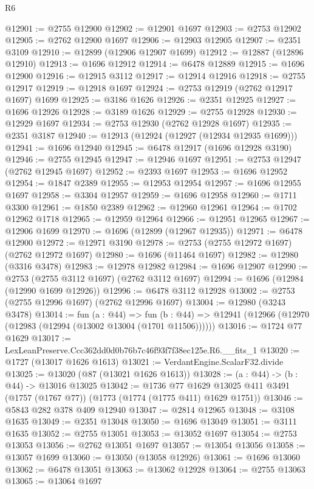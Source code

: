 \begin{lexlean}{R6}
\begin{coremodule}
@12901 := @2755 @12900
@12902 := @12901 @1697
@12903 := @2753 @12902
@12905 := @2762 @12900 @1697
@12906 := @12903 @12905
@12907 := @2351 @3109
@12910 := @12899 (@12906 @12907 @1699)
@12912 := @12887 (@12896 @12910)
@12913 := @1696 @12912
@12914 := @6478 @12889
@12915 := @1696 @12900
@12916 := @12915 @3112
@12917 := @12914 @12916
@12918 := @2755 @12917
@12919 := @12918 @1697
@12924 := @2753 @12919 (@2762 @12917 @1697) @1699
@12925 := @3186 @1626
@12926 := @2351 @12925
@12927 := @1696 @12926
@12928 := @3189 @1626
@12929 := @2755 @12928
@12930 := @12929 @1697
@12934 := @2753 @12930 (@2762 @12928 @1697)
@12935 := @2351 @3187
@12940 := @12913 (@12924 (@12927 (@12934 @12935 @1699)))
@12941 := @1696 @12940
@12945 := @6478 @12917 (@1696 @12928 @3190)
@12946 := @2755 @12945
@12947 := @12946 @1697
@12951 := @2753 @12947 (@2762 @12945 @1697)
@12952 := @2393 @1697
@12953 := @1696 @12952
@12954 := @1847 @2389
@12955 := @12953 @12954
@12957 := @1696 @12955 @1697
@12958 := @3304 @12957
@12959 := @1696 @12958
@12960 := @1711 @3300
@12961 := @1850 @2389
@12962 := @12960 @12961
@12964 := @1702 @12962 @1718
@12965 := @12959 @12964
@12966 := @12951 @12965
@12967 := @12906 @1699
@12970 := @1696 (@12899 (@12967 @12935))
@12971 := @6478 @12900
@12972 := @12971 @3190
@12978 := @2753 (@2755 @12972 @1697) (@2762 @12972 @1697)
@12980 := @1696 (@11464 @1697)
@12982 := @12980 (@3316 @3478)
@12983 := @12978 @12982
@12984 := @1696 @12907
@12990 := @2753 (@2755 @3112 @1697) (@2762 @3112 @1697)
@12994 := @1696 (@12984 (@12990 @1699 @12926))
@12996 := @6478 @3112 @12928
@13002 := @2753 (@2755 @12996 @1697) (@2762 @12996 @1697)
@13004 := @12980 (@3243 @3478)
@13014 := fun (a : @44) =>
  fun (b : @44) => @12941 (@12966 (@12970 (@12983 (@12994 (@13002 @13004 (@1701 @11506))))))
@13016 := @1724 @77 @1629
@13017 := LexLeanPreserve.Ccc362dd0d0b76b7c46f93f7f38ec125e.R6.__fits_1
@13020 := @1727 (@13017 @1626 @1613)
@13021 := VerdantEngine.ScalarF32.divide
@13025 := @13020 (@87 (@13021 @1626 @1613))
@13028 := (a : @44) -> (b : @44) -> @13016 @13025
@13042 := @1736
    @77
    @1629
    @13025
    @411
    @3491
    (@1757 (@1767 @77))
    (@1773 (@1774 (@1775 @411) @1629 @1751))
@13046 := @5843 @282 @378 @409 @12940
@13047 := @2814 @12965
@13048 := @3108 @1635
@13049 := @2351 @13048
@13050 := @1696 @13049
@13051 := @3111 @1635
@13052 := @2755 @13051
@13053 := @13052 @1697
@13054 := @2753 @13053
@13056 := @2762 @13051 @1697
@13057 := @13054 @13056
@13058 := @13057 @1699
@13060 := @13050 (@13058 @12926)
@13061 := @1696 @13060
@13062 := @6478 @13051
@13063 := @13062 @12928
@13064 := @2755 @13063
@13065 := @13064 @1697

\end{coremodule}
\end{lexlean}
